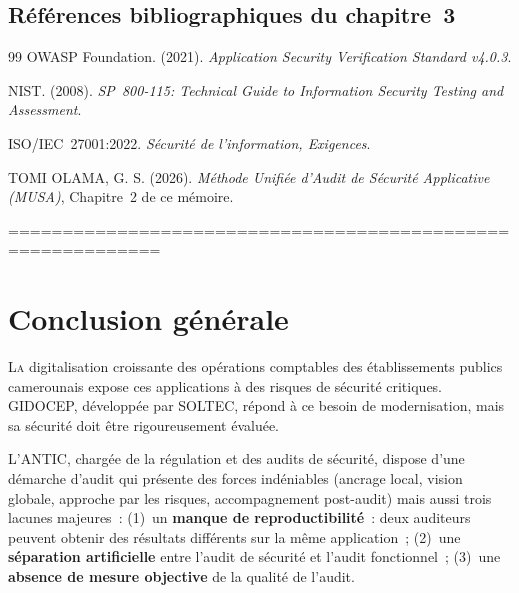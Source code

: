 \documentclass[12pt,a4paper,oneside]{report}
\begin{document}
\section*{Références bibliographiques du chapitre~3}

\begin{thebibliography}{99}
	 OWASP Foundation. (2021).
	\textit{Application Security Verification Standard v4.0.3}.
	
	 NIST. (2008).
	\textit{SP~800-115: Technical Guide to Information Security Testing
		and Assessment}.
	
	 ISO/IEC~27001:2022.
	\textit{Sécurité de l'information, Exigences}.
	
	 TOMI OLAMA, G. S. (2026).
	\textit{Méthode Unifiée d'Audit de Sécurité Applicative (MUSA)},
	Chapitre~2 de ce mémoire.
\end{thebibliography}	
%
 ============================================================



\cleardoublepage
\chapter*{Conclusion générale}

\vspace{-0.5cm}

\lettrine[lines=3,lhang=0.1,loversize=0.1]{\color{navy}L}{a}
digitalisation croissante des opérations comptables des établissements
publics camerounais expose ces applications à des risques de sécurité
critiques. GIDOCEP, développée par SOLTEC, répond à ce besoin de
modernisation, mais sa sécurité doit être rigoureusement évaluée.

L'ANTIC, chargée de la régulation et des audits de sécurité, dispose
d'une démarche d'audit qui présente des forces indéniables (ancrage
local, vision globale, approche par les risques, accompagnement
post-audit) mais aussi trois lacunes majeures~: (1)~un \textbf{manque
	de reproductibilité}~: deux auditeurs peuvent obtenir des résultats
différents sur la même application~; (2)~une \textbf{séparation
	artificielle} entre l'audit de sécurité et l'audit fonctionnel~;
(3)~une \textbf{absence de mesure objective} de la qualité de l'audit.
\end{document}

